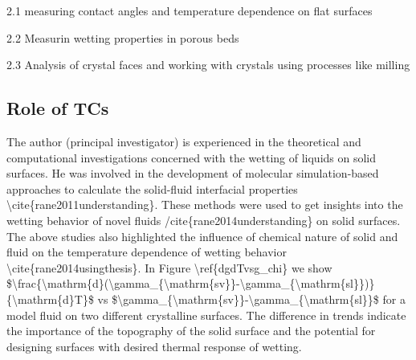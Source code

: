 \par 2.1 measuring contact angles and temperature dependence on flat surfaces
\par 2.2 Measurin wetting properties in porous beds
\par 2.3 Analysis of crystal faces and working with crystals using processes like milling\subsection{Role of TCs}

\par The author (principal investigator) is experienced in the theoretical and computational investigations concerned with the wetting of liquids on solid surfaces. He was involved in the development of molecular simulation-based approaches to calculate the solid-fluid interfacial properties \textbackslash cite\{rane2011understanding\}. These methods were used to get insights into the wetting behavior of novel fluids /cite\{rane2014understanding\} on solid surfaces. The above studies also highlighted the influence of chemical nature of solid and fluid on the temperature dependence of wetting behavior \textbackslash cite\{rane2014usingthesis\}. In Figure \textbackslash ref\{dgdTvsg\_chi\} we show \$\textbackslash frac\{\textbackslash mathrm\{d\}(\textbackslash gamma\_\{\textbackslash mathrm\{sv\}\}-\textbackslash gamma\_\{\textbackslash mathrm\{sl\}\})\}\{\textbackslash mathrm\{d\}T\}\$ vs \$\textbackslash gamma\_\{\textbackslash mathrm\{sv\}\}-\textbackslash gamma\_\{\textbackslash mathrm\{sl\}\}\$ for a model fluid on two different crystalline surfaces. The difference in trends indicate the importance of the topography of the solid surface and the potential for designing surfaces with desired thermal response of wetting.
